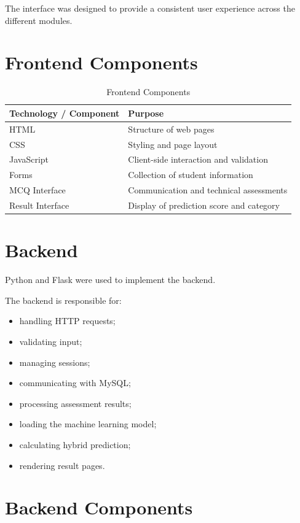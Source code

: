 \documentclass[12pt,a4paper]{report}
\begin{document}
The interface was designed to provide a consistent user
experience across the different modules.

\section{Frontend Components}

\begin{table}[H]
\centering
\caption{Frontend Components}

\begin{tabularx}{\textwidth}{p{}Y}
\toprule
\textbf{Technology / Component} & \textbf{Purpose} \\
\midrule
HTML & Structure of web pages \\
CSS & Styling and page layout \\
JavaScript & Client-side interaction and validation \\
Forms & Collection of student information \\
MCQ Interface & Communication and technical assessments \\
Result Interface & Display of prediction score and category \\
\bottomrule
\end{tabularx}
\end{table}

\section{Backend}

Python and Flask were used to implement the backend.

The backend is responsible for:

\begin{itemize}
    \item handling HTTP requests;
    \item validating input;
    \item managing sessions;
    \item communicating with MySQL;
    \item processing assessment results;
    \item loading the machine learning model;
    \item calculating hybrid prediction;
    \item rendering result pages.
\end{itemize}

\section{Backend Components}
\end{document}
